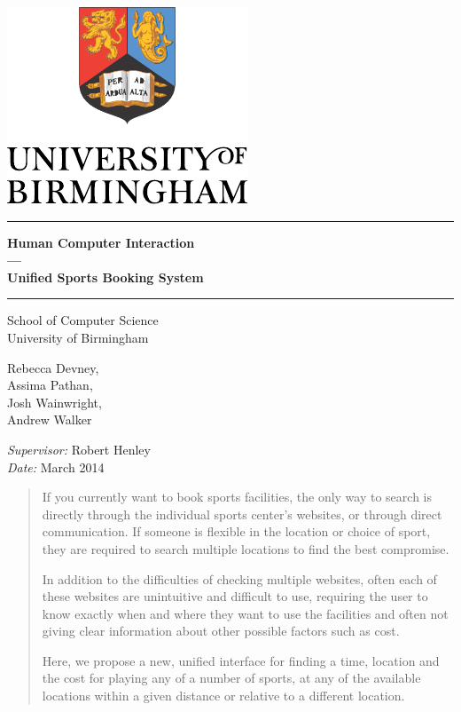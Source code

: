 \begin{titlepage}
    \begin{center}
    \vspace*{\fill}

    \centering
    \includegraphics[scale=1.0]{Logo.pdf}
    \vfill

    \hrule
    {\LARGE\bf Human Computer Interaction \\
    	--- \\
        Unified Sports Booking System\\[0.4cm]}
    \hrule

    \vfill
    \large
    School of Computer Science\\
    University of Birmingham

    \vfill{%
        Rebecca Devney,\\
        Assima Pathan,\\
        Josh Wainwright,\\
        Andrew Walker}
    \vfill

    \vfill
    \textit{Supervisor:} Robert Henley \\
    \vfill
    \textit{Date:} March 2014
    \vfill
    \vfill

    \begin{abstract}
        If you currently want to book sports facilities, the only way to search is
        directly through the individual sports center's websites, or through direct
        communication. If someone is flexible in the location or choice of sport, they
        are required to search multiple locations to find the best compromise.

        In addition to the difficulties of checking multiple websites, often each of
        these websites are unintuitive and difficult to use, requiring the user to know
        exactly when and where they want to use the facilities and often not giving clear
        information about other possible factors such as cost.

        Here, we propose a new, unified interface for finding a time, location
        and the cost for playing any of a number of sports, at any of the
        available locations within a given distance or relative to a different
        location.
    \end{abstract}

    \end{center}
\end{titlepage}


